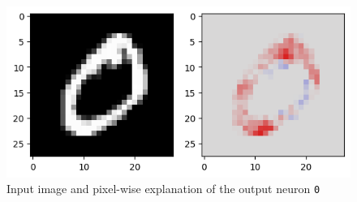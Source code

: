 \documentclass[twocolumn]{../cs-classes/cs-classes}
\newcommand*{\1}{\digitsbb{1}}
\newcommand*{\0}{\digitsbb{0}}
\begin{document}
\begin{figure}[H]
    \centering
    \includegraphics[width=.9\linewidth]{mnist-lrp.png}
    \caption{Input image and pixel-wise explanation of the output neuron \texttt{0}}
    \label{fig:mnist-lrp}
\end{figure}
\end{document}
